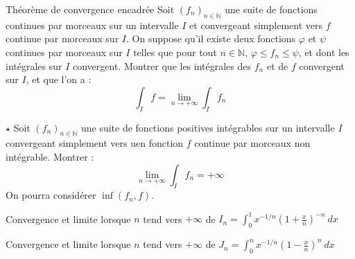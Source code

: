 \documentclass[french,a4paper]{article}
\newcommand{\N}{\mathbb{N}}
\theoremstyle{plain}
\theoremstyle{definition}
\theoremstyle{remark}
\begin{document}
\begin{ex}[Moulin.IP.05]{Théorème de convergence encadrée}
	Soit $(f_n)_{n\in\N}$ une suite de fonctions continues par morceaux sur un intervalle $I$ et convergeant simplement vers $f$ continue par morceaux sur $I$. On suppose qu'il existe deux fonctions $\varphi$ et $\psi$ continues par morceaux sur $I$ telles que pour tout $n\in\N$, $\varphi\leqslant f_n\leqslant\psi$, et dont les intégrales sur $I$ convergent. Montrer que les intégrales des $f_n$ et de $f$ convergent sur $I$, et que l'on a : $$\int_I f=\lim_{n\to+\infty} \int_I f_n$$
\end{ex}

\begin{ex}[Moulin.IP.06]{$\star$}
	Soit $(f_n)_{n\in\N}$ une suite de fonctions positives intégrables sur un intervalle $I$ convergeant simplement vers uen fonction $f$ continue par morceaux non intégrable. Montrer : $$\lim_{n\to+\infty}\int_I f_n=+\infty$$ On pourra considérer $\inf(f_n,f)$.
\end{ex}

\begin{ex}[Moulin.IP.07]{}
	Convergence et limite lorsque $n$ tend vers $+\infty$ de $I_n=\displaystyle\int_{0}^{1}x^{-1/n}\left(1+\frac{x}{n}\right)^{-n}\ dx$
\end{ex}

\begin{ex}[Moulin.IP.08]{}
	Convergence et limite lorsque $n$ tend vers $+\infty$ de $J_n=\displaystyle\int_{0}^{n}x^{-1/n}\left(1-\frac{x}{n}\right)^{n}\ dx$
\end{ex}
\end{document}
